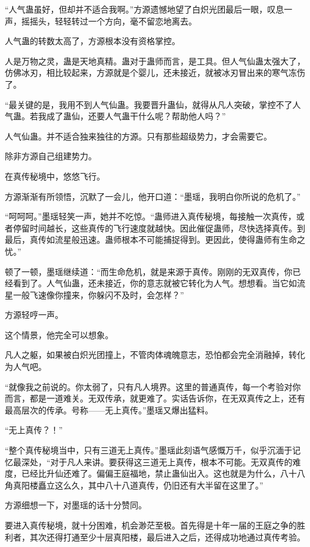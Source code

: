 \begin{this_body}
“人气蛊虽好，但却并不适合我啊。”方源遗憾地望了白炽光团最后一眼，叹息一声，摇摇头，轻轻转过一个方向，毫不留恋地离去。

人气蛊的转数太高了，方源根本没有资格掌控。

人是万物之灵，蛊是天地真精。蛊对于蛊师而言，是工具。但人气仙蛊太强大了，仿佛冰刃，相比较起来，方源就是个婴儿，还未接近，就被冰刃冒出来的寒气冻伤了。

“最关键的是，我用不到人气仙蛊。我要晋升蛊仙，就得从凡人突破，掌控不了人气蛊。若我成了蛊仙，还要人气蛊干什么呢？帮助他人吗？”

人气仙蛊。并不适合独来独往的方源。只有那些超级势力，才会需要它。

除非方源自己组建势力。

在真传秘境中，悠悠飞行。

方源渐渐有所领悟，沉默了一会儿，他开口道：“墨瑶，我明白你所说的危机了。”

“呵呵呵。”墨瑶轻笑一声，她并不吃惊。“蛊师进入真传秘境，每接触一次真传，或者停留时间越长，这些真传的飞行速度就越快。因此催促蛊师，尽快选择真传。到最后，真传如流星般迅速。蛊师根本不可能捕捉得到。更因此，使得蛊师有生命之忧。”

顿了一顿，墨瑶继续道：“而生命危机，就是来源于真传。刚刚的无双真传，你已经看到了。人气仙蛊，还未接近，你的意志就被它转化为人气。想想看。当它如流星一般飞速像你撞来，你躲闪不及时，会怎样？”

方源轻哼一声。

这个情景，他完全可以想象。

凡人之躯，如果被白炽光团撞上，不管肉体魂魄意志，恐怕都会完全消融掉，转化为人气吧。

“就像我之前说的。你太弱了，只有凡人境界。这里的普通真传，每一个考验对你而言，都是一道难关。无双传承，就更难了。实话告诉你，在无双真传之上，还有最高层次的传承。号称——无上真传。”墨瑶又爆出猛料。

“无上真传？！”

“整个真传秘境当中，只有三道无上真传。”墨瑶此刻语气感慨万千，似乎沉湎于记忆最深处，“对于凡人来讲。要获得这三道无上真传，根本不可能。无双真传的难度，已经比升仙还难了。偏偏王庭福地，禁止蛊仙出入。这也就是为什么，八十八角真阳楼矗立这么久，其中八十八道真传，仍旧还有大半留在这里了。”

方源细想一下，对墨瑶的话十分赞同。

要进入真传秘境，就十分困难，机会渺茫至极。首先得是十年一届的王庭之争的胜利者，其次还得打通至少十层真阳楼，最后进入之后，还得成功地通过真传考验。


\end{this_body}
